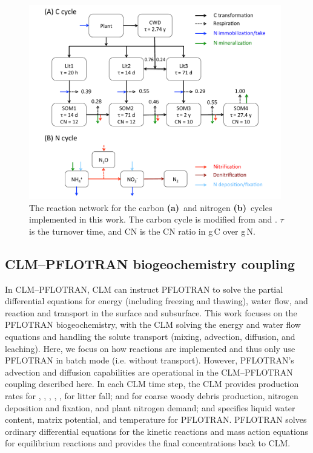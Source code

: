 \documentclass[gmd,noline]{copernicus}
\begin{document}
\begin{figure}[t]
\includegraphics[width=110mm]{gmd-2015-254-f01.pdf}
\caption{The reaction network for the carbon \textbf{(a)}~and nitrogen
\textbf{(b)}~cycles implemented in this work. The carbon cycle is modified
from \citet{Thornton2005} and \citet{Bonan2012}. $\tau$ is the turnover time,
and CN is the CN ratio in g\,C over g\,N.} \label{fig:conceptualmodel}
\end{figure}




\subsection{CLM--PFLOTRAN biogeochemistry coupling}%

      In CLM--PFLOTRAN, CLM can instruct PFLOTRAN to solve the partial
      differential equations for energy (including freezing and thawing),
      water flow, and reaction and transport in the surface and
      subsurface. This work focuses on the PFLOTRAN biogeochemistry, with the
      CLM solving the energy and water flow equations and handling the
      solute transport (mixing, advection, diffusion, and leaching).
Here, we focus on how reactions are implemented and thus only use PFLOTRAN in
batch mode (i.e. without transport). However, PFLOTRAN's advection and
diffusion capabilities are operational in the CLM--PFLOTRAN coupling described
here. In each
      CLM time step, the CLM provides production rates for ,
      , , , , 
      for litter fall;  and  for coarse woody debris
      production, nitrogen deposition and fixation, and plant nitrogen
      demand; and specifies liquid water content, matrix potential, and
      temperature for PFLOTRAN. PFLOTRAN solves ordinary differential
      equations for the kinetic reactions and mass action equations for
      equilibrium reactions and provides the final concentrations back to
      CLM.
\end{document}
